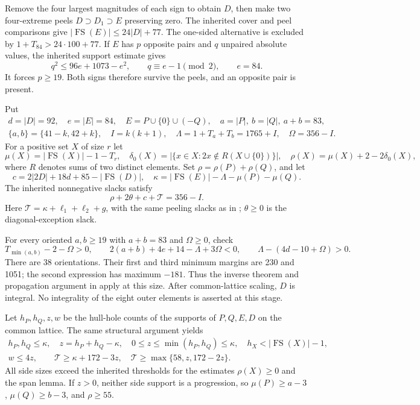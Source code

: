 \documentclass[11pt,a4paper]{article}
\newcommand{\FS}{\operatorname{FS}}
\newcommand{\T}{\mathcal T}
\begin{document}
Remove the four largest magnitudes of each sign to obtain $D$, then make
two four-extreme peels $D\supset D_1\supset E$ preserving zero. The
inherited cover and peel comparisons give $|\FS(E)|\le24|D|+77$.
The one-sided alternative is excluded by $1+T_{84}>24\cdot100+77$.
If $E$ has $p$ opposite pairs and $q$ unpaired absolute values, the
inherited support estimate gives
\[
 q^2\le96e+1073-e^2,\qquad q\equiv e-1\pmod2,\qquad e=84.
\]
It forces $p\ge19$. Both signs therefore survive the peels, and an
opposite pair is present.

Put
\begin{gather*}
 d=|D|=92,\quad e=|E|=84,\quad E=P\cup\{0\}\cup(-Q),\quad
 a=|P|,\ b=|Q|,\ a+b=83,\\
 \{a,b\}=\{41-k,42+k\},\quad I=k(k+1),\quad
 \Lambda=1+T_a+T_b=1765+I,\quad \Omega=356-I.
\end{gather*}
For a positive set $X$ of size $r$ let
\[
 \mu(X)=|\FS(X)|-1-T_r,\quad
 \delta_0(X)=|\{x\in X:2x\notin R(X\cup\{0\})\}|,
 \quad\rho(X)=\mu(X)+2-2\delta_0(X),
\]
where $R$ denotes sums of two distinct elements. Set
$\rho=\rho(P)+\rho(Q)$, and let
\[
 c=2|2D|+18d+85-|\FS(D)|,\quad
 \kappa=|\FS(E)|-\Lambda-\mu(P)-\mu(Q).
\]
The inherited nonnegative slacks satisfy
\begin{equation}\label{eq:budget}
 \rho+2\theta+c+\T=356-I.
\end{equation}
Here $\T=\kappa+\ell_1+\ell_2+g$, with the same peeling slacks as in
\cite{base100}; $\theta\ge0$ is the diagonal-exception slack.

For every oriented $a,b\ge19$ with $a+b=83$ and $\Omega\ge0$, check
\[
 T_{\min(a,b)}-2-\Omega>0,\qquad
 2(a+b)+4e+14-\Lambda+3\Omega<0,
 \qquad \Lambda-(4d-10+\Omega)>0.
\]
There are 38 orientations. Their first and third minimum margins are
230 and 1051; the second expression has maximum $-181$.
Thus the inverse theorem and propagation argument in \cite{base103}
apply at this size. After common-lattice scaling, $D$ is integral.
No integrality of the eight outer elements is asserted at this stage.

Let $h_P,h_Q,z,w$ be the hull-hole counts of the supports of $P,Q,E,D$
on the common lattice. The same structural argument yields
\begin{gather}
 h_P,h_Q\le\kappa,\quad z=h_P+h_Q-\kappa,
 \quad0\le z\le\min(h_P,h_Q)\le\kappa,
 \quad h_X<|\FS(X)|-1,\label{eq:holes}\\
 w\le4z,\qquad
 \T\ge\kappa+172-3z,\quad
 \T\ge\max\{58,z,172-2z\}.\label{eq:T}
\end{gather}
All side sizes exceed the inherited thresholds for the estimates
$\rho(X)\ge0$ and the span lemma. If $z>0$, neither side support is a
progression, so $\mu(P)\ge a-3$, $\mu(Q)\ge b-3$, and $\rho\ge55$.
\end{document}
